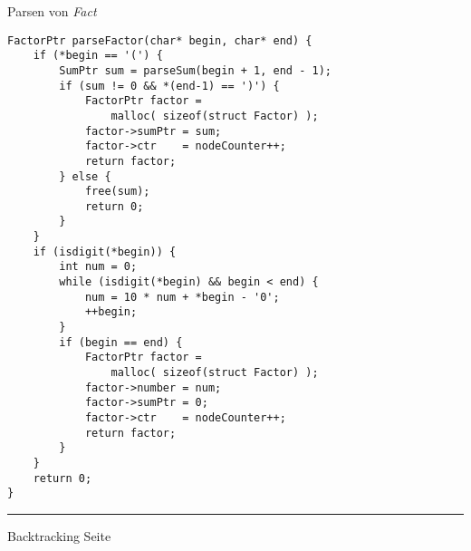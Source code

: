 
\begin{slide}{}
\normalsize

\begin{center}
Parsen von \textsl{Fact}
\end{center}
\vspace*{0.5cm}

\footnotesize
\begin{verbatim}
FactorPtr parseFactor(char* begin, char* end) {
    if (*begin == '(') {
        SumPtr sum = parseSum(begin + 1, end - 1);
        if (sum != 0 && *(end-1) == ')') {
            FactorPtr factor = 
                malloc( sizeof(struct Factor) );
            factor->sumPtr = sum;
            factor->ctr    = nodeCounter++;
            return factor;
        } else {
            free(sum);
            return 0;
        }
    } 
    if (isdigit(*begin)) {
        int num = 0;
        while (isdigit(*begin) && begin < end) {
            num = 10 * num + *begin - '0';
            ++begin;
        }
        if (begin == end) {
            FactorPtr factor = 
                malloc( sizeof(struct Factor) );
            factor->number = num;
            factor->sumPtr = 0;
            factor->ctr    = nodeCounter++;
            return factor;
        } 
    }
    return 0;
}
\end{verbatim}

\vspace*{\fill}
\tiny \addtocounter{mypage}{1}
\rule{17cm}{1mm}
Backtracking  \hspace*{\fill} Seite 
\end{slide}



